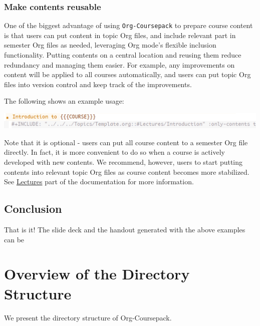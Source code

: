 \documentclass[10pt,article]{article}
\begin{document}
\subsubsection{Make contents reusable}
\label{sec:org192744c}
One of the biggest advantage of using \texttt{Org-Coursepack} to prepare course
content is that users can put content in topic Org files, and include relevant
part in semester Org files as needed, leveraging Org mode's flexible inclusion
functionality. Putting contents on a central location and reusing them reduce
redundancy and managing them easier. For example, any improvements on content 
will be applied to all courses automatically, and users can put topic Org
files into version control and keep track of the improvements.

The following shows an example usage:

\begin{center}
\includegraphics[height=0.8cm]{../../../Assets/Images/Org-Teaching/Quickstart_Lecture-Editing_Include.png}
\end{center}

Note that it is optional - users can put all course content to a semester Org
file directly. In fact, it is more convenient to do so when a course is
actively developed with new contents. We recommend, however, users to start
putting contents into relevant topic Org files as course content becomes more
stabilized. See \href{https://joonro.github.io/Org-Coursepack/Lectures/08\%2520Semester\%2520Org\%2520Files\%25203\%25204\%2520Lectures.html}{Lectures} part of the documentation for more information.
\subsection{Conclusion}
\label{sec:org4a34d0d}
That is it! The slide deck and the handout generated with the above examples can be 
\section{Overview of the Directory Structure}
\label{sec:org0c82b3d}
We present the directory structure of Org-Coursepack.
\end{document}
